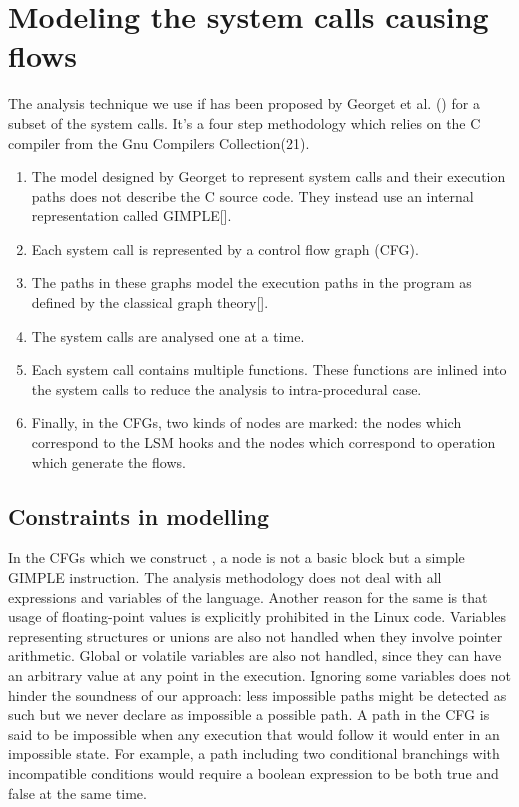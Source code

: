 \section{Modeling the system calls causing flows}
The analysis technique we use if has been proposed by Georget et al. () for a subset of the system calls. It's a four step methodology which relies on the C compiler from the Gnu Compilers Collection(21). 

\begin{enumerate}
	\item The model designed by Georget to represent system calls and their execution paths does not describe the C source code. They instead use an internal representation called GIMPLE[]. 
	\item Each system call is represented by a control flow graph (CFG).
	\item The paths in these graphs model the execution paths in the program as defined by the classical graph theory[].
	\item The system calls are analysed one at a time. 
	\item Each system call contains multiple functions. These functions are inlined into the system calls to reduce the analysis to intra-procedural case. 
	\item Finally, in the CFGs, two kinds of nodes are marked: the nodes which correspond to the LSM hooks and the nodes which correspond to operation which generate the flows. 
	
\end{enumerate}

\subsection{Constraints in modelling}
In the CFGs which we construct , a node is not a basic block but a simple GIMPLE instruction. The analysis methodology does not deal with all expressions and variables of the language. Another reason for the same is that usage of floating-point values is explicitly prohibited in the Linux code. Variables representing structures or unions are also not handled when they involve pointer arithmetic. Global or volatile variables are also not handled, since they can have an arbitrary value at any point in the execution. Ignoring some variables does not hinder the soundness of
our approach: less impossible paths might be detected as such but
we never declare as impossible a possible path. A path in the CFG is said to be impossible when any execution
that would follow it would enter in an impossible state. For example,
a path including two conditional branchings with incompatible
conditions would require a boolean expression to be both true and
false at the same time.


